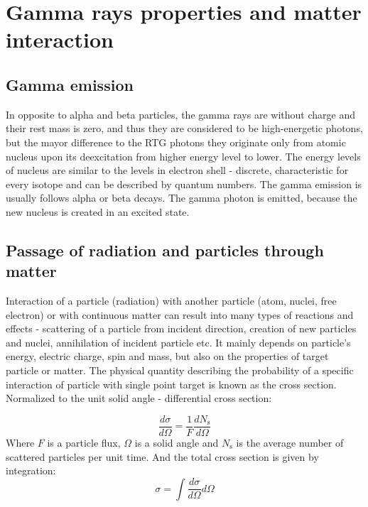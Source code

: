 
\chapter{Gamma rays properties and matter interaction}


\section{Gamma emission}
In opposite to alpha and beta particles, the gamma rays are without charge and their rest mass is zero, and thus they are considered to be high-energetic photons, but the mayor difference to the RTG photons they originate only from atomic nucleus upon its deexcitation from higher energy level to lower. The energy levels of nucleus are similar to the levels in electron shell - discrete, characteristic for every isotope and can be described by quantum numbers. The gamma emission is usually follows alpha or beta decays. The gamma photon is emitted, because the new nucleus is created in an excited state.


\section{Passage of radiation and particles through matter}
Interaction of a particle (radiation) with another particle (atom, nuclei, free electron) or with continuous matter can result into many types of reactions and effects - scattering of a particle from incident direction, creation of new particles and nuclei, annihilation of incident particle etc. It mainly depends on particle's energy, electric charge, spin and mass, but also on the properties of target particle or matter. The physical quantity describing the probability of a specific interaction of particle with single point target is known as the cross section. Normalized to the unit solid angle - differential cross section:



 \begin{equation}
\frac{d\sigma}{d\Omega} = \frac{1}{F} \frac{dN_\textrm{s}}{d\Omega}
 \end{equation}
Where $F$ is a particle flux, $\Omega$ is a solid angle and $N_\textrm{s}$ is the average number of scattered particles per unit time.
And the total cross section is given by integration:
  \begin{equation}
 \sigma = \int \frac{d\sigma}{d\Omega} d\Omega
 \end{equation}

